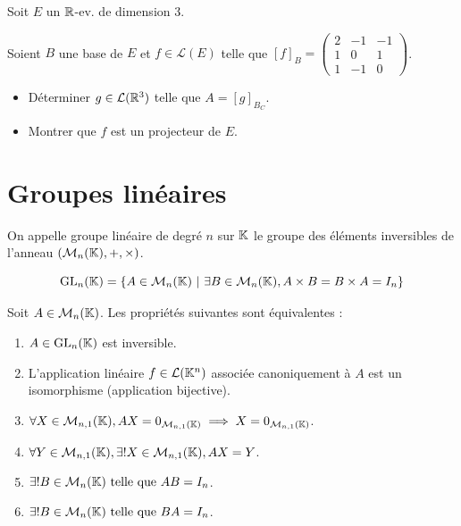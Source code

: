 \documentclass[12pt, a4paper]{report}
\begin{document}
\begin{example}
    Soit $E$ un $\mathbb{R}$-ev. de dimension $3$.

    Soient $B$ une base de $E$ et $f\in \mathcal L(E)$ telle que $[f]_B = \left(\begin{matrix} 2 & -1 & -1 \\ 1 & 0 & 1 \\ 1 & -1 & 0 \end{matrix}\right)$.
    \begin{itemize}
        \item Déterminer $g \in \mathcal L(\mathbb{R}^3)$ telle que $A = [g]_{B_C}$.
        \item Montrer que $f$ est un projecteur de $E$.
    \end{itemize}
\end{example}

\section{Groupes linéaires}

\begin{definition}
    On appelle groupe linéaire de degré $n$ sur $\mathbb{K}$ le groupe des éléments inversibles de l'anneau $(\mathcal M_n(\mathbb{K}),+,\times)$.

    $$\mathrm{GL}_n(\mathbb{K}) = \{A \in \mathcal M_n(\mathbb{K})~|~\exists B \in \mathcal M_n(\mathbb{K}), A\times B = B \times A = I_n\}$$
\end{definition}

\begin{property}
    Soit $A \in \mathcal M_n(\mathbb{K})$. Les propriétés suivantes sont équivalentes :
    \begin{enumerate}
        \item $A \in \mathrm{GL}_n(\mathbb{K})$ est inversible.
        \item L'application linéaire $f \in \mathcal L(\mathbb{K}^n)$ associée canoniquement à $A$ est un isomorphisme (application bijective).
        \item $\forall X \in \mathcal M_{n,1}(\mathbb{K}), AX = 0_{\mathcal M_{n,1}(\mathbb{K})} \implies X = 0_{\mathcal M_{n,1}(\mathbb{K})}$.
        \item $\forall Y \in \mathcal M_{n,1}(\mathbb{K}), \exists ! X \in \mathcal M_{n,1}(\mathbb{K}), AX = Y$.
        \item $\exists ! B \in \mathcal M_n(\mathbb{K}) \text{ telle que } AB = I_n$.
        \item $\exists ! B \in \mathcal M_n(\mathbb{K}) \text{ telle que } BA = I_n$.
    \end{enumerate}
\end{property}
\end{document}

